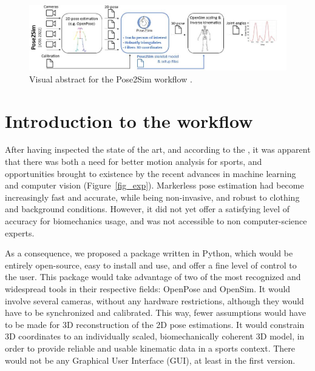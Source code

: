 \pagebreak
\minitoc

\vspace*{3cm}

\begin{figure}[hbtp]
	\centering
	\def\svgwidth{1\columnwidth}
	\fontsize{10pt}{10pt}\selectfont
	\includegraphics[width=\linewidth]{"../Intro/Figures/Fig_VisAbstract1.JPG"}
      \caption{Visual abstract for the Pose2Sim workflow \cite{Pagnon2022b}.}
	\label{fig_visabstract1}
\end{figure}

\newpage


\section{Introduction to the workflow}

After having inspected the state of the art, and according to the , it was apparent that there was both a need for better motion analysis for sports, and opportunities brought to existence by the recent advances in machine learning and computer vision (Figure~\ref{fig_exp}). Markerless pose estimation had become increasingly fast and accurate, while being non-invasive, and robust to clothing and background conditions. However, it did not yet offer a satisfying level of accuracy for biomechanics usage, and was not accessible to non computer-science experts.

As a consequence, we proposed a package written in Python, which would be entirely open-source, easy to install and use, and offer a fine level of control to the user. This package would take advantage of two of the most recognized and widespread tools in their respective fields: OpenPose and OpenSim. It would involve several cameras, without any hardware restrictions, although they would have to be synchronized and calibrated. This way, fewer assumptions would have to be made for 3D reconstruction of the 2D pose estimations. It would constrain 3D coordinates to an individually scaled, biomechanically coherent 3D model, in order to provide reliable and usable kinematic data in a sports context. There would not be any Graphical User Interface (GUI), at least in the first version.


